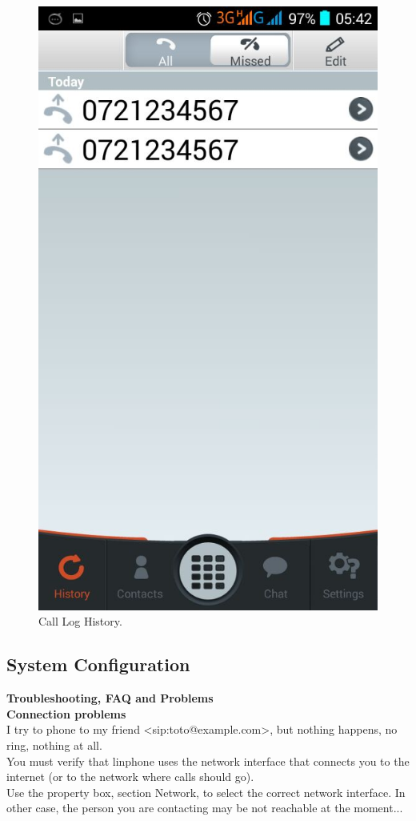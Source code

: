 \documentclass[a4paper]{article}
\begin{document}
\begin{center}
\begin{figure}[H]
\centering
\includegraphics[width=0.7\linewidth]{pictures/Screenshot_2015-08-04-05-42-53.png}
\caption{\label{fig:Screen9}Call Log History.}
\end{figure}
\end{center}

\newpage
\subsection{System Configuration}
\textbf{Troubleshooting, FAQ and Problems} \\

\textbf{Connection problems} \\
I try to phone to my friend <sip:toto@example.com>, but nothing happens, no ring, nothing
at all. \\
You must verify that linphone uses the network interface that connects you to the
internet (or to the network where calls should go). \\
Use the property box, section Network, to select the correct network interface.
In other case, the person you are contacting may be not reachable at the moment... \\
\end{document}
